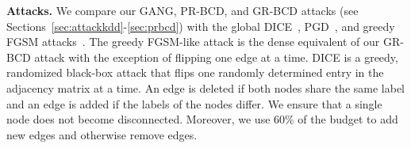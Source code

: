 \documentclass[sigconf,authordraft]{acmart}
\begin{document}
\textbf{Attacks.} We compare our GANG, PR-BCD, and GR-BCD attacks (see Sections~\ref{sec:attackkdd}-\ref{sec:prbcd}) with the global DICE~\citep{Waniek2018}, PGD~\citep{Xu2019a}, and greedy FGSM attacks~\citet{Geisler2020}. The greedy FGSM-like attack is the dense equivalent of our GR-BCD attack with the exception of flipping one edge at a time. DICE is a greedy, randomized black-box attack that flips one randomly determined entry in the adjacency matrix at a time. An edge is deleted if both nodes share the same label and an edge is added if the labels of the nodes differ. We ensure that a single node does not become disconnected. Moreover, we use 60\% of the budget to add new edges and otherwise remove edges.

\begin{table}[t]
  \centering
  \caption{Statistics of the used datasets. For the dense adjacency matrix we assume that each element is represented by 4 bytes. In the sparse case we use two 8 byte integer pointers and a 4 bytes float value.}
  \label{tab:datasets}
\end{table}
\end{document}
